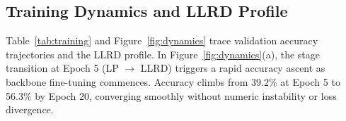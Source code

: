 \documentclass[10pt,twocolumn,letterpaper]{article}
\begin{document}
\subsection{Training Dynamics and LLRD Profile}
\label{sec:convergence}

Table~\ref{tab:training} and Figure~\ref{fig:dynamics} trace validation accuracy trajectories and the LLRD profile. In Figure~\ref{fig:dynamics}(a), the stage transition at Epoch 5 (LP $\rightarrow$ LLRD) triggers a rapid accuracy ascent as backbone fine-tuning commences. Accuracy climbs from 39.2\% at Epoch 5 to 56.3\% by Epoch 20, converging smoothly without numeric instability or loss divergence.

\begin{table}[t]
\centering
\caption{
  \textbf{Training dynamics of Agri-DINO on MedicinalPlant.}
  Epoch 5 marks the LP $\rightarrow$ LLRD transition. Val Acc is Top-1; Val Loss is cross-entropy.
}
\label{tab:training}
\setlength{\tabcolsep}{6pt}
\end{table}
\end{document}
